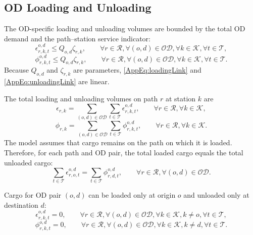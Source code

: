 \documentclass[11pt]{article}
\begin{document}
\subsection{OD Loading and Unloading}
\label{App:LoadingUnloading}

The OD-specific loading and unloading volumes are bounded by the total OD demand and the path--station service indicator:
\begin{equation}
\epsilon_{r,k,t}^{o,d}
\leq
Q_{o,d}\zeta_{r,k},
\qquad
\forall r\in\mathcal{R},
\forall (o,d)\in\mathcal{OD},
\forall k\in\mathcal{K},
\forall t\in\mathcal{T},
\label{AppEq:loadingLink}
\end{equation}
\begin{equation}
\phi_{r,k,t}^{o,d}
\leq
Q_{o,d}\zeta_{r,k},
\qquad
\forall r\in\mathcal{R},
\forall (o,d)\in\mathcal{OD},
\forall k\in\mathcal{K},
\forall t\in\mathcal{T}.
\label{AppEq:unloadingLink}
\end{equation}
Because $Q_{o,d}$ and $\zeta_{r,k}$ are parameters, \eqref{AppEq:loadingLink} and \eqref{AppEq:unloadingLink} are linear.

The total loading and unloading volumes on path $r$ at station $k$ are
\begin{equation}
\epsilon_{r,k}
=
\sum_{(o,d)\in\mathcal{OD}}
\sum_{t\in\mathcal{T}}
\epsilon_{r,k,t}^{o,d},
\qquad
\forall r\in\mathcal{R},
\forall k\in\mathcal{K},
\label{AppEq:loadingTotal}
\end{equation}
\begin{equation}
\phi_{r,k}
=
\sum_{(o,d)\in\mathcal{OD}}
\sum_{t\in\mathcal{T}}
\phi_{r,k,t}^{o,d},
\qquad
\forall r\in\mathcal{R},
\forall k\in\mathcal{K}.
\label{AppEq:unloadingTotal}
\end{equation}
The model assumes that cargo remains on the path on which it is loaded. Therefore, for each path and OD pair, the total loaded cargo equals the total unloaded cargo:
\begin{equation}
\sum_{t\in\mathcal{T}} \epsilon_{r,o,t}^{o,d}
=
\sum_{t\in\mathcal{T}} \phi_{r,d,t}^{o,d},
\qquad
\forall r\in\mathcal{R},
\forall (o,d)\in\mathcal{OD}.
\label{AppEq:cargoConservation}
\end{equation}

Cargo for OD pair $(o,d)$ can be loaded only at origin $o$ and unloaded only at destination $d$:
\begin{equation}
\epsilon_{r,k,t}^{o,d}=0,
\qquad
\forall r\in\mathcal{R},
\forall (o,d)\in\mathcal{OD},
\forall k\in\mathcal{K},
k\neq o,
\forall t\in\mathcal{T},
\label{AppEq:loadingOrigin}
\end{equation}
\begin{equation}
\phi_{r,k,t}^{o,d}=0,
\qquad
\forall r\in\mathcal{R},
\forall (o,d)\in\mathcal{OD},
\forall k\in\mathcal{K},
k\neq d,
\forall t\in\mathcal{T}.
\label{AppEq:unloadingDestination}
\end{equation}
\end{document}
